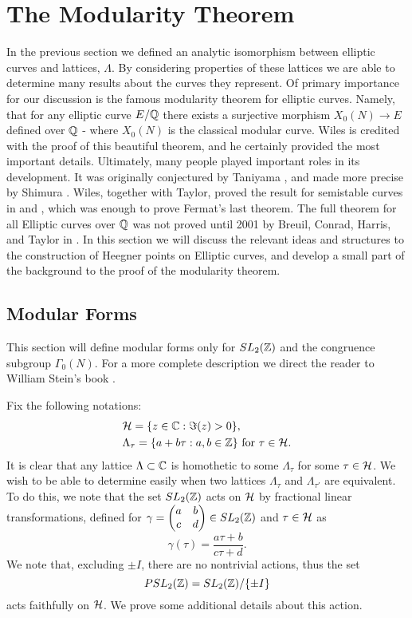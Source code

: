 
\chapter{The Modularity Theorem}
In the previous section we defined an analytic isomorphism between elliptic curves and lattices, $\Lambda$. By considering properties of these lattices we are able to determine many results about the curves they represent. Of primary importance for our discussion is the famous modularity theorem for elliptic curves. Namely, that for any elliptic curve $E/\mathbb{Q}$ there exists a surjective morphism $X_0(N) \to E$ defined over $\mathbb{Q}$ - where $X_0(N)$ is the classical modular curve. Wiles is credited with the proof of this beautiful theorem, and he certainly provided the most important details. Ultimately, many people played important roles in its development. It was originally conjectured by Taniyama \cite{MR0082727}, and made more precise by Shimura \cite{Shimura,Shimura1}. Wiles, together with Taylor, proved the result for semistable curves in \cite{Wiles} and \cite{Taylor&Wiles}, which was enough to prove Fermat's last theorem. The full theorem for all Elliptic curves over $\mathbb{Q}$ was not proved until 2001 by Breuil, Conrad, Harris, and Taylor in \cite{MR1839918}. In this section we will discuss the relevant ideas and structures to the construction of Heegner points on Elliptic curves, and develop a small part of the background to the proof of the modularity theorem.

\section{Modular Forms}
This section will define modular forms only for $SL_2(\mathbb{Z})$ and the congruence subgroup $\Gamma_0(N)$. For a more complete description we direct the reader to William Stein's book \cite{Stein}. 

Fix the following notations:
\begin{align*}
&\mathcal{H} = \{z \in \mathbb{C} : \Im(z) > 0\}, \\
&\Lambda_\tau = \{a + b\tau : a,b \in \mathbb{Z}\} \text{ for } \tau \in \mathcal{H}.
\end{align*}
It is clear that any lattice $\Lambda \subset \mathbb{C}$ is homothetic to some $\Lambda_\tau$ for some $\tau \in \mathcal{H}$. We wish to be able to determine easily when two lattices $\Lambda_{\tau}$ and $\Lambda_{\tau'}$ are equivalent. To do this, we note that the set $SL_2(\mathbb{Z})$ acts on $\mathcal{H}$ by fractional linear transformations, defined for $\gamma = \begin{pmatrix} a & b \\  c & d \end{pmatrix} \in SL_2(\mathbb{Z})$ and $\tau \in \mathcal{H}$ as
$$\gamma (\tau) = \frac{a\tau + b}{c\tau + d}.$$
We note that, excluding $\pm I$, there are no nontrivial actions, thus the set 
$$PSL_2(\mathbb{Z}) = SL_2(\mathbb{Z})/\{\pm I\}$$
acts faithfully on $\mathcal{H}$. We prove some additional details about this action.

